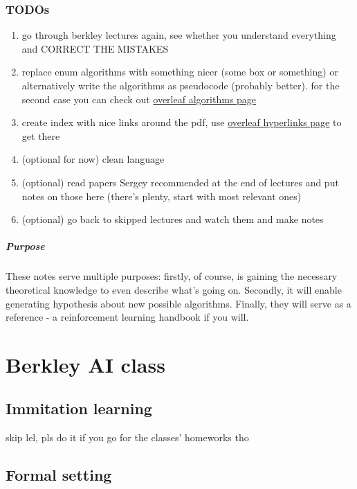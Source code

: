 \documentclass{report}
\begin{document}
\subsection{TODOs}
\begin{enumerate}
		\item go through berkley lectures again, see whether you understand everything and CORRECT THE MISTAKES
		\item replace enum algorithms with something nicer (some box or something) or alternatively write the algorithms as pseudocode (probably better).
				for the second case you can check out \href{https://www.overleaf.com/learn/latex/Algorithms}{overleaf algorithms page}
		\item create index with nice links around the pdf, use \href{https://www.overleaf.com/learn/latex/Hyperlinks}{overleaf hyperlinks page} to get there
		\item (optional for now) clean language
		\item (optional) read papers Sergey recommended at the end of lectures and put notes on those here (there's plenty, start with most relevant ones)
		\item (optional) go back to skipped lectures and watch them and make notes
\end{enumerate}

\paragraph{Purpose}
These notes serve multiple purposes:
firstly, of course, is gaining the necessary theoretical knowledge to even describe what's going on.
Secondly, it will enable generating hypothesis about new possible algorithms.
Finally, they will serve as a reference - a reinforcement learning handbook if you will.


\chapter{Berkley AI class}
\section{Immitation learning}
skip lel, pls do it if you go for the classes' homeworks tho

\section{Formal setting}
\end{document}

